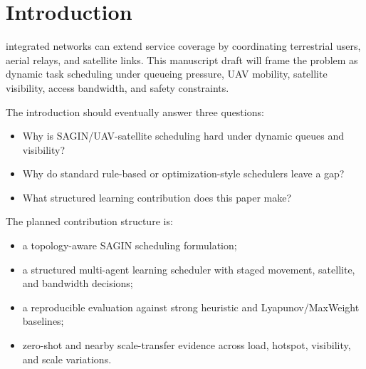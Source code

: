 \section{Introduction}
 integrated networks can extend service
coverage by coordinating terrestrial users, aerial relays, and satellite
links. This manuscript draft will frame the problem as dynamic task scheduling
under queueing pressure, UAV mobility, satellite visibility, access bandwidth,
and safety constraints.

The introduction should eventually answer three questions:
\begin{itemize}
    \item Why is SAGIN/UAV-satellite scheduling hard under dynamic queues and visibility?
    \item Why do standard rule-based or optimization-style schedulers leave a gap?
    \item What structured learning contribution does this paper make?
\end{itemize}

The planned contribution structure is:
\begin{itemize}
    \item a topology-aware SAGIN scheduling formulation;
    \item a structured multi-agent learning scheduler with staged movement, satellite, and bandwidth decisions;
    \item a reproducible evaluation against strong heuristic and Lyapunov/MaxWeight baselines;
    \item zero-shot and nearby scale-transfer evidence across load, hotspot, visibility, and scale variations.
\end{itemize}
